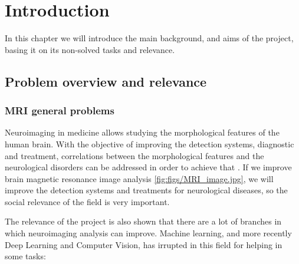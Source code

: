 \chapter{Introduction}
\label{chapter:introduccion}

In this chapter we will introduce the main background, and aims of the project, basing it on its non-solved tasks and relevance.

\section{Problem overview and relevance}

\subsection{MRI general problems}

Neuroimaging in medicine allows studying the morphological features of the human brain. With the objective of improving the detection systems, diagnostic and treatment, correlations between the morphological features and the neurological disorders can be addressed in order to achieve that \cite{abou2006neuroimaging}. If we improve brain magnetic resonance image analysis \ref{fig:figs/MRI_image.jpg}, we will improve the detection systems and treatments for neurological diseases, so the social relevance of the field is very important.


The relevance of the project is also shown that there are a lot of branches in which neuroimaging analysis can improve. Machine learning, and more recently Deep Learning and Computer Vision, has irrupted in this field for helping in some tasks: 

